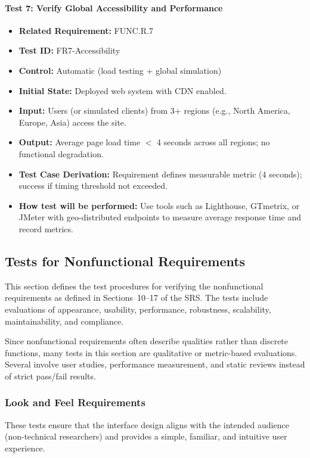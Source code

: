 \documentclass[12pt, titlepage]{article}
\begin{document}
\paragraph{Test 7: Verify Global Accessibility and Performance}
\begin{itemize}
    \item \textbf{Related Requirement:} FUNC.R.7
    \item \textbf{Test ID:} FR7-Accessibility
    \item \textbf{Control:} Automatic (load testing + global simulation)
    \item \textbf{Initial State:} Deployed web system with CDN enabled.
    \item \textbf{Input:} Users (or simulated clients) from 3+ regions (e.g., North America, Europe, Asia) access the site.
    \item \textbf{Output:} Average page load time $<$ 4 seconds across all regions; no functional degradation.
    \item \textbf{Test Case Derivation:} Requirement defines measurable metric (4 seconds); success if timing threshold not exceeded.
    \item \textbf{How test will be performed:} Use tools such as Lighthouse, GTmetrix, or JMeter with geo-distributed endpoints to measure average response time and record metrics.
\end{itemize}


\subsection{Tests for Nonfunctional Requirements}

This section defines the test procedures for verifying the nonfunctional
requirements as defined in Sections~10--17 of the SRS. The tests include
evaluations of appearance, usability, performance, robustness, scalability,
maintainability, and compliance. 

Since nonfunctional requirements often describe qualities rather than discrete
functions, many tests in this section are qualitative or metric-based
evaluations. Several involve user studies, performance measurement, and static
reviews instead of strict pass/fail results.

\subsubsection{Look and Feel Requirements}

These tests ensure that the interface design aligns with the intended audience
(non-technical researchers) and provides a simple, familiar, and intuitive
user experience.
\end{document}
